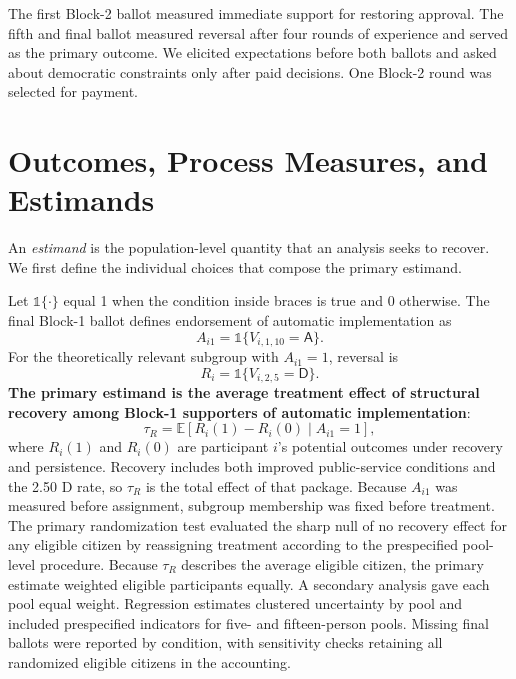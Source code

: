 \documentclass[11pt]{article}
\newcommand{\Dproc}{\textsf{D}}
\newcommand{\Aproc}{\textsf{A}}
\newcommand{\ind}[1]{\mathbb{1}\{#1\}}
\begin{document}
The first Block-2 ballot measured immediate support for restoring approval. The fifth and final ballot measured reversal after four rounds of experience and served as the primary outcome. We elicited expectations before both ballots and asked about democratic constraints only after paid decisions. One Block-2 round was selected for payment.


\section{Outcomes, Process Measures, and Estimands}

An \emph{estimand} is the population-level quantity that an analysis seeks to recover. We first define the individual choices that compose the primary estimand.

Let \(\ind{\cdot}\) equal 1 when the condition inside braces is true and 0 otherwise. The final Block-1 ballot defines endorsement of automatic implementation as
\begin{equation}
A_{i1}=\ind{V_{i,1,10}=\Aproc}.
\end{equation}
For the theoretically relevant subgroup with $A_{i1}=1$, reversal is
\begin{equation}
R_i=\ind{V_{i,2,5}=\Dproc}.
\end{equation}
{\bf The primary estimand is the average treatment effect of structural recovery among Block-1 supporters of automatic implementation}:
\begin{equation}
\tau_R=\mathbb{E}[R_i(1)-R_i(0)\mid A_{i1}=1],
\end{equation}
where \(R_i(1)\) and \(R_i(0)\) are participant \(i\)'s potential outcomes under recovery and persistence. Recovery includes both improved public-service conditions and the 2.50 \Dproc{} rate, so \(\tau_R\) is the total effect of that package. Because $A_{i1}$ was measured before assignment, subgroup membership was fixed before treatment. The primary randomization test evaluated the sharp null of no recovery effect for any eligible citizen by reassigning treatment according to the prespecified pool-level procedure. Because \(\tau_R\) describes the average eligible citizen, the primary estimate weighted eligible participants equally. A secondary analysis gave each pool equal weight. Regression estimates clustered uncertainty by pool and included prespecified indicators for five- and fifteen-person pools. Missing final ballots were reported by condition, with sensitivity checks retaining all randomized eligible citizens in the accounting.
\end{document}
